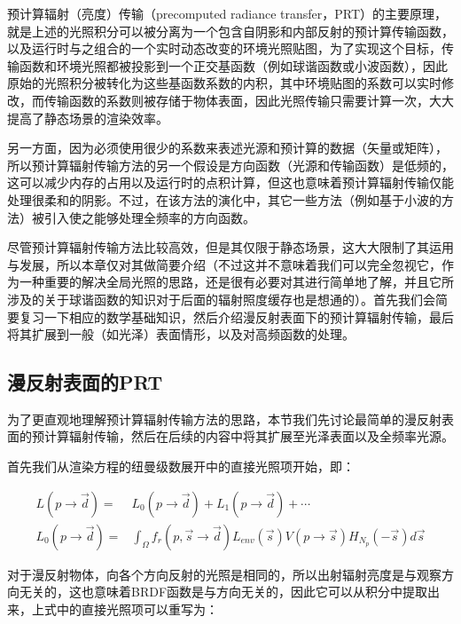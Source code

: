 预计算辐射（亮度）传输（precomputed radiance transfer，PRT）\cite{a:PrecomputedRadianceTransferforRealTimeRenderinginDynamicLowFrequencyLightingEnvironments}的主要原理，就是上述的光照积分可以被分离为一个包含自阴影和内部反射的预计算传输函数，以及运行时与之组合的一个实时动态改变的环境光照贴图，为了实现这个目标，传输函数和环境光照都被投影到一个正交基函数（例如球谐函数或小波函数），因此原始的光照积分被转化为这些基函数系数的内积，其中环境贴图的系数可以实时修改，而传输函数的系数则被存储于物体表面，因此光照传输只需要计算一次，大大提高了静态场景的渲染效率。

另一方面，因为必须使用很少的系数来表述光源和预计算的数据（矢量或矩阵），所以预计算辐射传输方法的另一个假设是方向函数（光源和传输函数）是低频的，这可以减少内存的占用以及运行时的点积计算，但这也意味着预计算辐射传输仅能处理很柔和的阴影。不过，在该方法的演化中，其它一些方法（例如基于小波的方法）被引入使之能够处理全频率的方向函数。

尽管预计算辐射传输方法比较高效，但是其仅限于静态场景，这大大限制了其运用与发展，所以本章仅对其做简要介绍（不过这并不意味着我们可以完全忽视它，作为一种重要的解决全局光照的思路，还是很有必要对其进行简单地了解，并且它所涉及的关于球谐函数的知识对于后面的辐射照度缓存也是想通的）。首先我们会简要复习一下相应的数学基础知识，然后介绍漫反射表面下的预计算辐射传输，最后将其扩展到一般（如光泽）表面情形，以及对高频函数的处理。



\subsection{漫反射表面的PRT}
为了更直观地理解预计算辐射传输方法的思路，本节我们先讨论最简单的漫反射表面的预计算辐射传输，然后在后续的内容中将其扩展至光泽表面以及全频率光源。

首先我们从渲染方程的纽曼级数展开中的直接光照项开始，即：

\begin{equation}
\begin{aligned}
	L(p\to\vec{d})=&L_0(p\to\vec{d})+L_1(p\to\vec{d})+\cdots \\
	L_0(p\to\vec{d})=&\int_\Omega f_r(p,\vec{s}\to\vec{d})L_{env}(\vec{s})V(p\to\vec{s})H_{N_p}(-\vec{s})d\vec{s}
\end{aligned}
\end{equation}

对于漫反射物体，向各个方向反射的光照是相同的，所以出射辐射亮度是与观察方向无关的，这也意味着BRDF函数是与方向无关的，因此它可以从积分中提取出来，上式中的直接光照项可以重写为：

